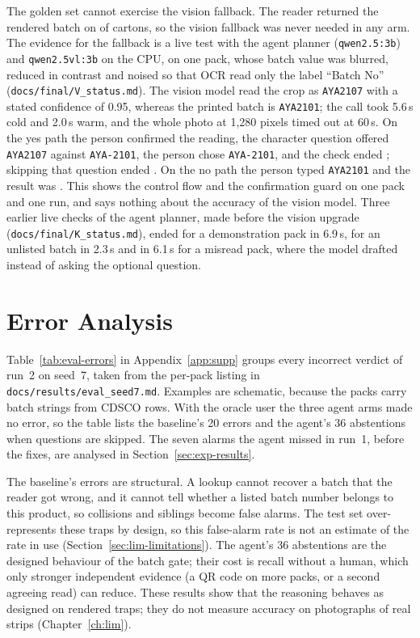 The golden set cannot exercise the vision fallback. The reader returned the rendered batch on  of
 cartons, so the vision fallback was never needed in any arm. The evidence for the
fallback is a live test with the agent planner (\texttt{qwen2.5:3b}) and \texttt{qwen2.5vl:3b} on the CPU, on one pack, whose batch value
was blurred, reduced in contrast and noised so that OCR read only the label ``Batch No'' (\texttt{docs/\allowbreak final/\allowbreak V\_status.md}). The vision model read
the crop as \texttt{AYA2107} with a stated confidence of 0.95, whereas the printed batch is \texttt{AYA2101}; the call took 5.6\,s cold and 2.0\,s warm,
and the whole photo at 1{,}280 pixels timed out at 60\,s. On the yes path the person confirmed the reading, the character question offered
\texttt{AYA2107} against \texttt{AYA-2101}, the person chose \texttt{AYA-2101}, and the check ended \FLAGGED{}; skipping that question ended \CANTV. On
the no path the person typed \texttt{AYA2101} and the result was \FLAGGED. This shows the control flow and the confirmation guard on one pack and one
run, and says nothing about the accuracy of the vision model. Three earlier live checks of the agent planner, made before the vision upgrade
(\texttt{docs/\allowbreak final/\allowbreak K\_status.md}), ended \FLAGGED{} for a demonstration pack in 6.9\,s, \NLISTED{} for an unlisted batch in 2.3\,s and \CANTV{} in
6.1\,s for a misread pack, where the model drafted instead of asking the optional question.

\section{Error Analysis}
\label{sec:eval-error-analysis}

Table~\ref{tab:eval-errors} in Appendix~\ref{app:supp} groups every incorrect verdict of run~2 on seed~7, taken from the
per-pack listing in \texttt{docs/results/eval\_seed7.md}. Examples are schematic, because the packs
carry batch strings from CDSCO rows. With the oracle user the three agent arms
made no error, so the table lists the baseline's 20 errors and the agent's 36 abstentions when
questions are skipped. The seven alarms the agent missed in run~1, before the fixes, are analysed
in Section~\ref{sec:exp-results}.

The baseline's errors are structural. A lookup cannot recover a batch that the reader got wrong, and
it cannot tell whether a listed batch number belongs to this product, so collisions and siblings
become false alarms. The test set over-represents these traps by design, so this false-alarm rate
is not an estimate of the rate in use (Section~\ref{sec:lim-limitations}).
The agent's 36 abstentions are the designed behaviour of the batch gate; their cost is recall
without a human, which only stronger independent evidence (a QR code on more packs, or a second
agreeing read) can reduce. These results show that the reasoning behaves as designed on rendered traps; they do not
measure accuracy on photographs of real strips (Chapter~\ref{ch:lim}).
